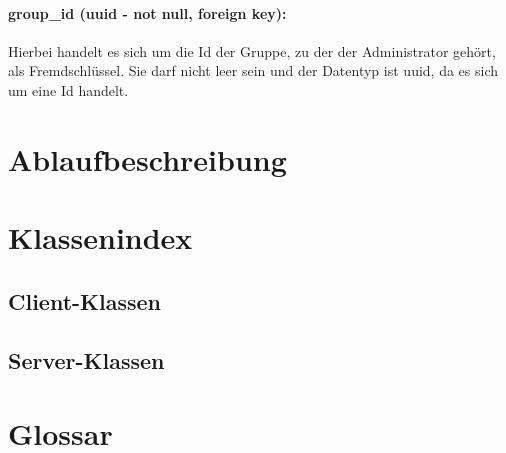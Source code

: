 \documentclass[parskip=full]{scrartcl}
\begin{document}
\paragraph{group\_id (uuid - not null, foreign key):} Hierbei handelt es sich um die Id der Gruppe, zu der der Administrator gehört, als Fremdschlüssel. Sie darf nicht leer sein und der Datentyp ist \Gls{uuid}, da es sich um eine Id handelt.
\newpage

\section{Ablaufbeschreibung}

\section{Klassenindex}
\subsection{Client-Klassen}
\subsection{Server-Klassen}
\newpage
\section{Glossar}
\printglossary[style=altlist]
\end{document}
